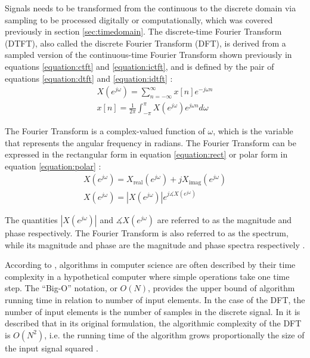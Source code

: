 \documentclass[report.tex]{subfiles}
\begin{document}
Signals needs to be transformed from the continuous to the discrete domain via sampling to be processed digitally or computationally, which was covered previously in section \ref{sec:timedomain}. The discrete-time Fourier Transform (DTFT), also called the discrete Fourier Transform (DFT), is derived from a sampled version of the continuous-time Fourier Transform shown previously in equations \eqref{equation:ctft} and \eqref{equation:ictft}, and is defined by the pair of equations \eqref{equation:dtft} and \eqref{equation:idtft} \parencite[289]{melbook}:
\begin{align}
	X(e^{j\omega}) = \sum_{n = -\infty}^{\infty}{x[n]e^{-j\omega n}} \tag{3}\label{equation:dtft} \\
	x[n] = \frac{1}{2\pi}\int_{-\pi}^{\pi}{X(e^{j\omega})e^{j\omega n}\mathit{d\omega}} \tag{4}\label{equation:idtft}
\end{align}

The Fourier Transform is a complex-valued function of $\omega$, which is the variable that represents the angular frequency in radians. The Fourier Transform can be expressed in the rectangular form in equation \eqref{equation:rect} or polar form in equation \eqref{equation:polar} \parencite[49]{discretebook}:
\begin{align}
	X(e^{j\omega}) = X_{\text{real}}(e^{j\omega}) + j X_{\text{imag}}(e^{j\omega}) \tag{5}\label{equation:rect} \\
	X(e^{j\omega}) = |X(e^{j\omega})|e^{j\measuredangle X(e^{j\omega})} \tag{6}\label{equation:polar}
\end{align}

The quantities $|X(e^{j\omega})|$ and $\measuredangle X(e^{j\omega})$ are referred to as the magnitude and phase respectively. The Fourier Transform is also referred to as the spectrum, while its magnitude and phase are the magnitude and phase spectra respectively \parencite{discretebook}.

According to \textcite{skiena}, algorithms in computer science are often described by their time complexity in a hypothetical computer where simple operations take one time step. The ``Big-O'' notation, or $O(N)$, provides the upper bound of algorithm running time in relation to number of input elements. In the case of the DFT, the number of input elements is the number of samples in the discrete signal. In \textcite[Chapter~9]{discretebook} it is described that in its original formulation, the algorithmic complexity of the DFT is $O(N^{2})$, i.e. the running time of the algorithm grows proportionally the size of the input signal squared \parencite{skiena}. 
\end{document}
